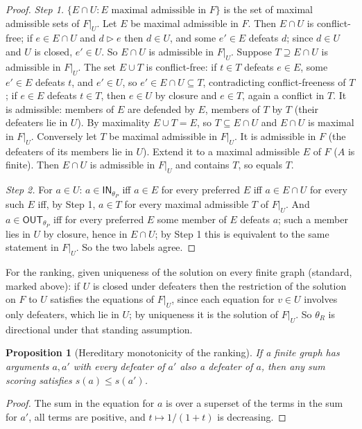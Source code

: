 \documentclass[11pt]{article}
\theoremstyle{plain}
\newtheorem{proposition}[theorem]{Proposition}
\theoremstyle{definition}
\theoremstyle{remark}
\newcommand{\IN}{\textsf{IN}}
\newcommand{\OUT}{\textsf{OUT}}
\newcommand{\dfeat}{\rhd}
\begin{document}
\begin{proof}
\emph{Step 1.} $\{E\cap U: E\text{ maximal admissible in }F\}$ is the set of maximal admissible sets of $F|_U$.
Let $E$ be maximal admissible in $F$. Then $E\cap U$ is conflict-free; if $e\in E\cap U$ and $d\dfeat e$ then $d\in U$, and some $e'\in E$ defeats $d$; since $d\in U$ and $U$ is closed, $e'\in U$. So $E\cap U$ is admissible in $F|_U$. Suppose $T\supseteq E\cap U$ is admissible in $F|_U$. The set $E\cup T$ is conflict-free: if $t\in T$ defeats $e\in E$, some $e'\in E$ defeats $t$, and $e'\in U$, so $e'\in E\cap U\subseteq T$, contradicting conflict-freeness of $T$; if $e\in E$ defeats $t\in T$, then $e\in U$ by closure and $e\in T$, again a conflict in $T$. It is admissible: members of $E$ are defended by $E$, members of $T$ by $T$ (their defeaters lie in $U$). By maximality $E\cup T=E$, so $T\subseteq E\cap U$ and $E\cap U$ is maximal in $F|_U$. Conversely let $T$ be maximal admissible in $F|_U$. It is admissible in $F$ (the defeaters of its members lie in $U$). Extend it to a maximal admissible $E$ of $F$ ($A$ is finite). Then $E\cap U$ is admissible in $F|_U$ and contains $T$, so equals $T$.

\emph{Step 2.} For $a\in U$: $a\in\IN_{\theta_P}$ iff $a\in E$ for every preferred $E$ iff $a\in E\cap U$ for every such $E$ iff, by Step 1, $a\in T$ for every maximal admissible $T$ of $F|_U$. And $a\in\OUT_{\theta_P}$ iff for every preferred $E$ some member of $E$ defeats $a$; such a member lies in $U$ by closure, hence in $E\cap U$; by Step 1 this is equivalent to the same statement in $F|_U$. So the two labels agree. \qedhere
\end{proof}

For the ranking, given uniqueness of the solution on every finite graph (standard, marked above): if $U$ is closed under defeaters then the restriction of the solution on $F$ to $U$ satisfies the equations of $F|_U$, since each equation for $v\in U$ involves only defeaters, which lie in $U$; by uniqueness it is the solution of $F|_U$. So $\theta_R$ is directional under that standing assumption.

\begin{proposition}[Hereditary monotonicity of the ranking]\label{prop:rankher}
If a finite graph has arguments $a,a'$ with every defeater of $a'$ also a defeater of $a$, then any sum scoring satisfies $s(a)\le s(a')$.
\end{proposition}

\begin{proof}
The sum in the equation for $a$ is over a superset of the terms in the sum for $a'$, all terms are positive, and $t\mapsto1/(1+t)$ is decreasing. \qedhere
\end{proof}
\end{document}
